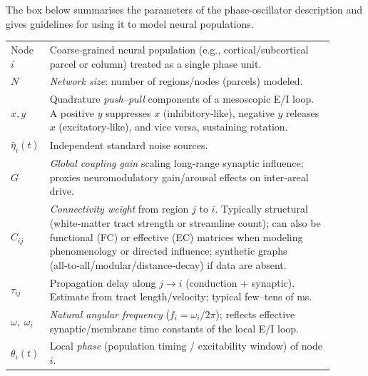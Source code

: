 \documentclass[11pt]{article}
\numberwithin{equation}{section}
\begin{document}
  

The box below summarises the parameters of the phase-oscillator description and gives guidelines for using it to model neural populations.

\begin{tcolorbox}[
  colback=gray!5,
  colframe=slate,
  colbacktitle=softblue!25,
  coltitle=softblue!60!black,
  fonttitle=\bfseries\small,
 title={\small  \textit{Coupled Undamped Harmonic Oscillators (Eq.~\ref{eq:kuramoto_connectome})}\\ Whole-brain Simulations Parameters \& Physiological Meaning },
  boxrule=0.4pt,
  enhanced, sharp corners,
  left=4pt,right=4pt,top=3pt,bottom=3pt,
  boxsep=2pt,
  before skip=6pt, after skip=6pt
]
\scriptsize
\begin{tabular}{@{}l p{0.9\linewidth}@{}}
Node $i$ & Coarse‑grained neural population (e.g., cortical/subcortical parcel or column) treated as a single phase unit.\\
\textbf{$N$} & \emph{Network size}: number of regions/nodes (parcels) modeled.\\
\textbf{$x,y$} & Quadrature \emph{push–pull} components of a mesoscopic E/I loop. A positive $y$ suppresses $x$ (inhibitory‑like), negative $y$ releases $x$ (excitatory‑like), and vice versa, sustaining rotation.\\
\textbf{$\hat\eta_i(t)$} & Independent standard noise sources.\\
\textbf{$G$} & \emph{Global coupling gain} scaling long‑range synaptic influence; proxies neuromodulatory gain/arousal effects on inter‑areal drive.\\
\textbf{$C_{ij}$} & \emph{Connectivity weight} from region $j$ to $i$. Typically structural (white‑matter tract strength or streamline count); can also be functional (FC) or effective (EC) matrices when modeling phenomenology or directed influence; synthetic graphs (all‑to‑all/modular/distance‑decay) if data are absent.\\
\textbf{$\tau_{ij}$} & Propagation delay along $j\!\to i$ (conduction + synaptic). Estimate from tract length/velocity; typical few–tens of ms.\\
\textbf{$\omega,\;\omega_i$} & \emph{Natural angular frequency} ($f_i=\omega_i/2\pi$); reflects effective synaptic/membrane time constants of the local E/I loop.\\
\textbf{$\theta_i(t)$} & Local \emph{phase} (population timing / excitability window) of node $i$.\\

\end{tabular}
\end{tcolorbox}
\end{document}
